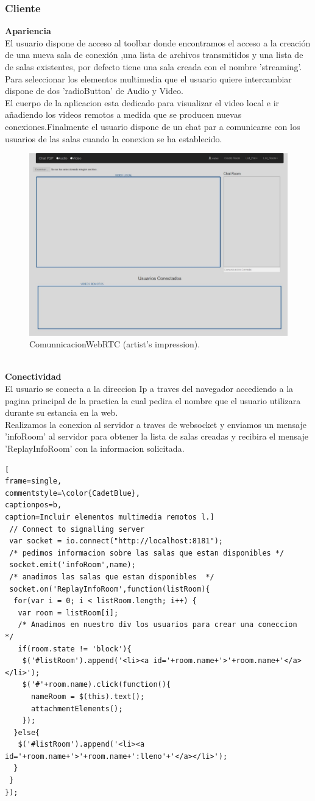 \subsubsection{Cliente}
\textbf{Apariencia }
\\El usuario dispone de acceso al toolbar donde encontramos el acceso a la creación de una nueva sala de conexión ,una lista de archivos transmitidos y una lista de de salas existentes, por defecto tiene una sala creada con el nombre 'streaming'.
\\Para seleccionar los elementos multimedia que el usuario quiere intercambiar dispone de dos 'radioButton' de Audio y Video. 
\\El cuerpo de la aplicacion esta dedicado para visualizar el video local e ir añadiendo los videos remotos a medida que se producen  nuevas conexiones.Finalmente el usuario dispone de un chat par
a comunicarse con los usuarios de las salas cuando la conexion se ha establecido.
\begin{figure}[h]
\centering
\includegraphics[width=0.6\linewidth]{Figures/esqueletoPractica}
\decoRule
\caption[An Electron]{ComunnicacionWebRTC (artist's impression).}
\label{fig:Conexcion_finish}
\end{figure}
\\\textbf{Conectividad}
\\El usuario se conecta a la direccion Ip a traves del navegador accediendo a la pagina principal de la practica la cual pedira el nombre que el usuario utilizara durante su estancia en la web. 
\\Realizamos la conexion al servidor a traves de websocket y enviamos un mensaje 'infoRoom' al servidor para obtener la lista de salas creadas y recibira el mensaje 'ReplayInfoRoom' con la informacion solicitada.
\begin{lstlisting}[
frame=single,
commentstyle=\color{CadetBlue},
captionpos=b,
caption=Incluir elementos multimedia remotos l.]
 // Connect to signalling server
 var socket = io.connect("http://localhost:8181");
 /* pedimos informacion sobre las salas que estan disponibles */
 socket.emit('infoRoom',name);
 /* anadimos las salas que estan disponibles  */
 socket.on('ReplayInfoRoom',function(listRoom){
  for(var i = 0; i < listRoom.length; i++) {
   var room = listRoom[i];
   /* Anadimos en nuestro div los usuarios para crear una coneccion  */
   if(room.state != 'block'){
    $('#listRoom').append('<li><a id='+room.name+'>'+room.name+'</a></li>');
    $('#'+room.name).click(function(){
      nameRoom = $(this).text();
      attachmentElements();
    });
  }else{
   $('#listRoom').append('<li><a id='+room.name+'>'+room.name+':lleno'+'</a></li>');
  }
 }	
});
\end{lstlisting}
